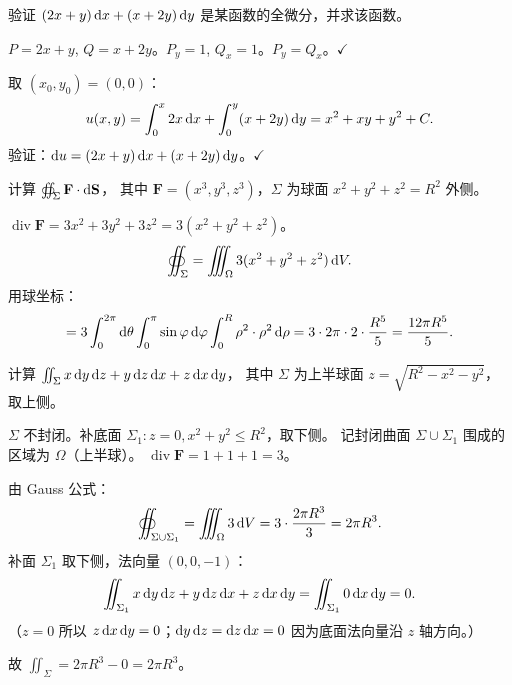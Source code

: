 \documentclass{article}
\DeclareMathOperator{\divergence}{div}
\begin{document}
\begin{exercise}[积分与路径无关]
  验证 $(2x+y)\,\mathrm{d} x + (x+2y)\,\mathrm{d} y$ 是某函数的全微分，并求该函数。
\end{exercise}

\begin{solution}
  $P = 2x+y$, $Q = x+2y$。$P_y = 1$, $Q_x = 1$。$P_y = Q_x$。$\checkmark$

  取 $(x_0, y_0) = (0, 0)$：
  \[
    u(x,y) = \int_0^x 2x \,\mathrm{d} x + \int_0^y (x+2y) \,\mathrm{d} y
    = x^2 + xy + y^2 + C.
  \]
  验证：$\mathrm{d} u = (2x+y)\,\mathrm{d} x + (x+2y)\,\mathrm{d} y$。$\checkmark$
\end{solution}

\begin{exercise}
  计算 $\oiint_\Sigma \mathbf{F}\cdot\mathrm{d}\mathbf{S}$，
  其中 $\mathbf{F} = (x^3, y^3, z^3)$，$\Sigma$ 为球面 $x^2+y^2+z^2=R^2$ 外侧。
\end{exercise}

\begin{solution}
  $\divergence\mathbf{F} = 3x^2+3y^2+3z^2 = 3(x^2+y^2+z^2)$。
  \[
    \oiint_\Sigma = \iiint_\Omega 3(x^2+y^2+z^2) \,\mathrm{d} V.
  \]
  用球坐标：
  \[
    =
    3\int_0^{2\pi}\mathrm{d}\theta\int_0^\pi\sin\varphi\,\mathrm{d}\varphi\int_0^R
    \rho^2\cdot\rho^2\,\mathrm{d}\rho
    = 3\cdot 2\pi\cdot 2\cdot\frac{R^5}{5}
    = \frac{12\pi R^5}{5}.
  \]
\end{solution}

\begin{exercise}
  计算 $\iint_\Sigma x\,\mathrm{d} y\,\mathrm{d} z + y\,\mathrm{d} z\,\mathrm{d} x + z\,\mathrm{d} x\,\mathrm{d} y$，
  其中 $\Sigma$ 为上半球面 $z = \sqrt{R^2-x^2-y^2}$，取上侧。
\end{exercise}

\begin{solution}
  $\Sigma$ 不封闭。补底面 $\Sigma_1: z=0, x^2+y^2 \le R^2$，取下侧。
  记封闭曲面 $\Sigma \cup \Sigma_1$ 围成的区域为 $\Omega$（上半球）。
  $\divergence\mathbf{F} = 1+1+1 = 3$。

  由 Gauss 公式：
  \[
    \oiint_{\Sigma \cup \Sigma_1} = \iiint_\Omega 3 \,\mathrm{d} V = 3
    \cdot \frac{2\pi R^3}{3} = 2\pi R^3.
  \]
  补面 $\Sigma_1$ 取下侧，法向量 $(0,0,-1)$：
  \[
    \iint_{\Sigma_1} x\,\mathrm{d} y\,\mathrm{d} z + y\,\mathrm{d} z\,\mathrm{d} x + z\,\mathrm{d} x\,\mathrm{d} y
    = \iint_{\Sigma_1} 0 \,\mathrm{d} x\,\mathrm{d} y = 0.
  \]
  （$z=0$ 所以 $z\,\mathrm{d} x\,\mathrm{d} y = 0$；$\mathrm{d} y\,\mathrm{d} z = \mathrm{d} z\,\mathrm{d} x = 0$
  因为底面法向量沿 $z$ 轴方向。）

  故 $\iint_\Sigma = 2\pi R^3 - 0 = 2\pi R^3$。
\end{solution}
\end{document}
